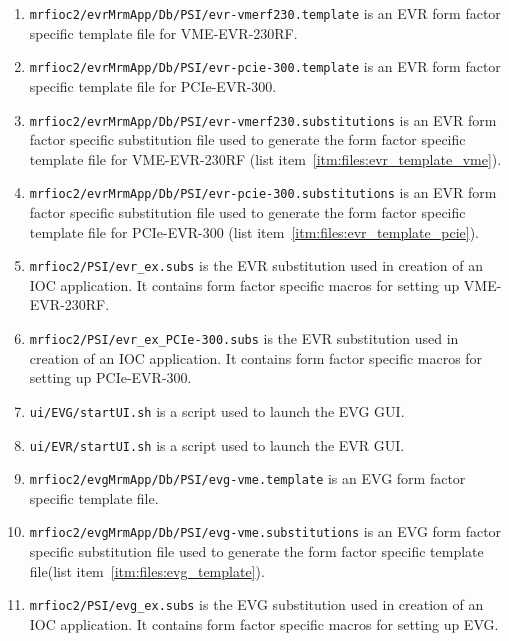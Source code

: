 \documentclass[12pt,a4paper]{article}
\begin{document}
\begin{enumerate}
\item 
	\texttt{mrfioc2/evrMrmApp/Db/PSI/evr-vmerf230.template} is an EVR form factor specific template file for VME-EVR-230RF.\label{itm:files:evr_template_vme}
\item 
	\texttt{mrfioc2/evrMrmApp/Db/PSI/evr-pcie-300.template} is an EVR form factor specific template file for PCIe-EVR-300.\label{itm:files:evr_template_pcie}
\item 
	\texttt{mrfioc2/evrMrmApp/Db/PSI/evr-vmerf230.substitutions} is an EVR form factor specific substitution file used to generate the form factor specific template file for VME-EVR-230RF (list item~\ref{itm:files:evr_template_vme}).\label{itm:files:evr_ff_subs_vme}
	\item 
		\texttt{mrfioc2/evrMrmApp/Db/PSI/evr-pcie-300.substitutions} is an EVR form factor specific substitution file used to generate the form factor specific template file for PCIe-EVR-300 (list item~\ref{itm:files:evr_template_pcie}).\label{itm:files:evr_ff_subs_pcie}
\item 
	\texttt{mrfioc2/PSI/evr\_ex.subs} is the EVR substitution used in creation of an IOC application. It contains form factor specific macros for setting up VME-EVR-230RF.\label{itm:files:evr_substitution_vme}
\item 
	\texttt{mrfioc2/PSI/evr\_ex\_PCIe-300.subs} is the EVR substitution used in creation of an IOC application. It contains form factor specific macros for setting up PCIe-EVR-300.\label{itm:files:evr_substitution_pcie}
\item 
	\texttt{ui/EVG/startUI.sh} is a script used to launch the EVG GUI.\label{itm:files:evg_gui}
\item 
	\texttt{ui/EVR/startUI.sh} is a script used to launch the EVR GUI.\label{itm:files:evr_gui}
\item 
	\texttt{mrfioc2/evgMrmApp/Db/PSI/evg-vme.template} is an EVG form factor specific template file.\label{itm:files:evg_template}
\item 
	\texttt{mrfioc2/evgMrmApp/Db/PSI/evg-vme.substitutions} is an EVG form factor specific substitution file used to generate the form factor specific template file(list item~\ref{itm:files:evg_template}).\label{itm:files:evg_ff_subs}
\item 
	\texttt{mrfioc2/PSI/evg\_ex.subs} is the EVG substitution used in creation of an IOC application. It contains form factor specific macros for setting up EVG.\label{itm:files:evg_substitution}
\end{enumerate}
\end{document}

